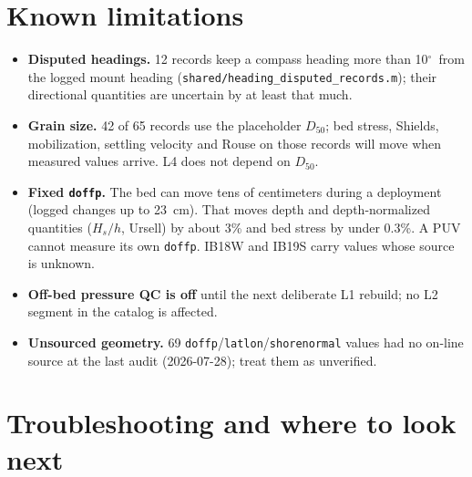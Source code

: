 \documentclass[11pt]{article}
\newcommand{\code}[1]{\texttt{#1}}
\providecommand{\degree}{\ensuremath{^{\circ}}}
\begin{document}
\section{Known limitations}
\label{sec:limits}

\begin{itemize}
\item \textbf{Disputed headings.} 12 records keep a compass heading more than 10\degree\ from the
  logged mount heading (\code{shared/heading\_disputed\_records.m}); their directional quantities
  are uncertain by at least that much.
\item \textbf{Grain size.} 42 of 65 records use the placeholder $D_{50}$; bed stress, Shields,
  mobilization, settling velocity and Rouse on those records will move when measured values
  arrive. L4 does not depend on $D_{50}$.
\item \textbf{Fixed \code{doffp}.} The bed can move tens of centimeters during a deployment (logged
  changes up to 23~cm). That moves depth and depth-normalized quantities ($H_s/h$, Ursell) by
  about 3\% and bed stress by under 0.3\%. A PUV cannot measure its own \code{doffp}. IB18W and
  IB19S carry values whose source is unknown.
\item \textbf{Off-bed pressure QC is off} until the next deliberate L1 rebuild; no L2 segment in
  the catalog is affected.
\item \textbf{Unsourced geometry.} 69 \code{doffp}/\code{latlon}/\code{shorenormal} values had no
  on-line source at the last audit (2026-07-28); treat them as unverified.
\end{itemize}

\section{Troubleshooting and where to look next}
\label{sec:troubleshooting}
\end{document}
